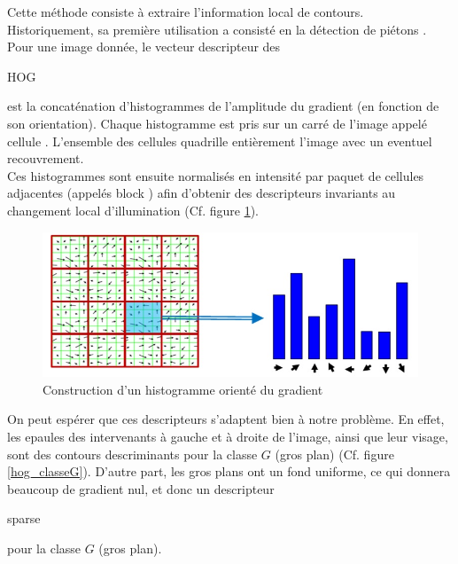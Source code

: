 \documentclass{book}
\begin{document}
Cette méthode consiste à extraire l'information local de contours. Historiquement, sa première utilisation a consisté en 
la détection de piétons \cite{hog}. Pour une image donnée, le vecteur descripteur des \begin{itshape}HOG\end{itshape} est la concaténation
d'histogrammes de l'amplitude du gradient (en fonction de son orientation). Chaque histogramme est pris sur un carré de l'image
appelé \og cellule \fg{}. L'ensemble des cellules quadrille entièrement l'image avec un eventuel recouvrement.\\
Ces histogrammes sont ensuite normalisés en intensité par paquet de cellules adjacentes (appelés \og block \fg{}) afin d'obtenir des descripteurs 
invariants au changement local d'illumination (Cf. figure \ref{hog}).
\begin{figure}[H]
\begin{center}
\includegraphics[scale=0.5]{hog.jpg}
\end{center}
\caption{Construction d'un histogramme orienté du gradient \cite{hog2}}
\label{hog}
\end{figure}

On peut espérer que ces descripteurs s'adaptent bien à notre problème. En effet, les epaules des intervenants à gauche 
et à droite de l'image, ainsi que leur visage, sont des contours descriminants pour la classe $G$ (gros plan)
(Cf. figure \ref{hog_classeG}). D'autre part, les gros plans ont un fond uniforme, 
ce qui donnera beaucoup de gradient nul, et donc un descripteur \begin{itshape}sparse\end{itshape} pour la classe $G$ (gros plan).
\end{document}
